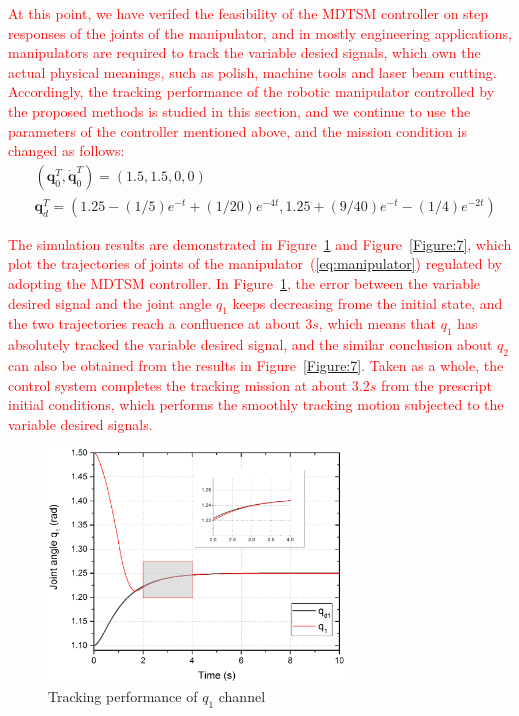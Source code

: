 \documentclass[3p]{elsarticle}
\theoremstyle{plain}
\theoremstyle{remark}
\begin{document}
\textcolor{red}{At this point, we have verifed the feasibility of the MDTSM controller on step responses of the joints of the manipulator, and in mostly engineering applications, manipulators are required to track the variable desied signals, which own the actual physical meanings, such as polish, machine tools and laser beam cutting. Accordingly, the tracking performance of the robotic manipulator controlled by the proposed methods is studied in this section, and we continue to use the parameters of the controller mentioned above, and the mission condition is changed as follows:}
\begin{align*}
&(\bm q_0^T, \dot{\bm q}_0^T)= (1.5,1.5,0,0)\\
&{\bm q}_d^T=(1.25-(1/5)e^{-t}+(1/20)e^{-4t},1.25+(9/40)e^{-t}-(1/4)e^{-2t})
\end{align*}\par
 \textcolor{red}{The simulation results are demonstrated in Figure~\ref{Figure:6} and Figure~\ref{Figure:7}, which plot the trajectories of joints of the manipulator~(\ref{eq:manipulator}) regulated by adopting the MDTSM controller. In Figure~\ref{Figure:6}, the error between the variable desired signal and the joint angle $q_1$ keeps decreasing frome the initial state, and the two trajectories reach a confluence at about $3s$, which means that $q_1$ has absolutely tracked the variable desired signal, and the similar conclusion about $q_2$ can also be obtained from the results in Figure~\ref{Figure:7}. Taken as a whole, the control system completes the tracking mission at about $3.2s$ from the prescript initial conditions, which performs the smoothly tracking motion subjected to the variable desired signals.}
\begin{figure}
\centering
\includegraphics[width=0.7\textwidth]{paper3_fig6.eps}
\caption{Tracking performance of $q_1$ channel}
\label{Figure:6}
\end{figure}
\end{document}
